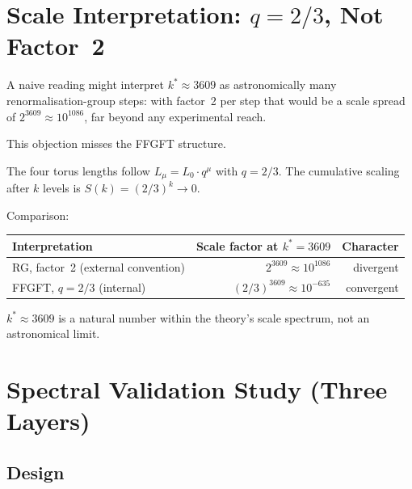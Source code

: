 \section{Scale Interpretation: $q=2/3$, Not Factor~2}

\begin{remark}\label{rem:scale275en}
A naive reading might interpret $k^* \approx 3609$ as astronomically many
renormalisation-group steps: with factor~2 per step that would be a scale
spread of $2^{3609} \approx 10^{1086}$, far beyond any experimental reach.

This objection misses the FFGFT structure.
\end{remark}

The four torus lengths follow $L_\mu = L_0\cdot q^\mu$ with $q = 2/3$.
The cumulative scaling after $k$ levels is $S(k) = (2/3)^k \to 0$.

\begin{proposition}\label{prop:conv275en}
Comparison:
\begin{center}
\begin{tabular}{@{}lrr@{}}
\toprule
Interpretation & Scale factor at $k^*=3609$ & Character \\
\midrule
RG, factor~2 (external convention) & $2^{3609}\approx 10^{1086}$ & divergent \\
FFGFT, $q=2/3$ (internal)          & $(2/3)^{3609}\approx 10^{-635}$ & convergent \\
\bottomrule
\end{tabular}
\end{center}
$k^* \approx 3609$ is a natural number within the theory's scale spectrum,
not an astronomical limit.
\end{proposition}

\section{Spectral Validation Study (Three Layers)}

\subsection{Design}

